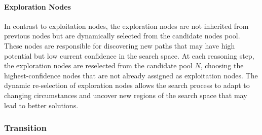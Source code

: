 \paragraph{Exploration Nodes} 
In contrast to exploitation nodes, the exploration nodes are not inherited from previous nodes but are dynamically selected from the candidate nodes pool. These nodes are responsible for discovering new paths that may have high potential but low current confidence in the search space. At each reasoning step, the exploration nodes are reselected from the candidate pool \( N \), choosing the highest-confidence nodes that are not already assigned as exploitation nodes. The dynamic re-selection of exploration nodes allows the search process to adapt to changing circumstances and uncover new regions of the search space that may lead to better solutions.






\subsubsection{Transition}
\label{sec:method_transition}

